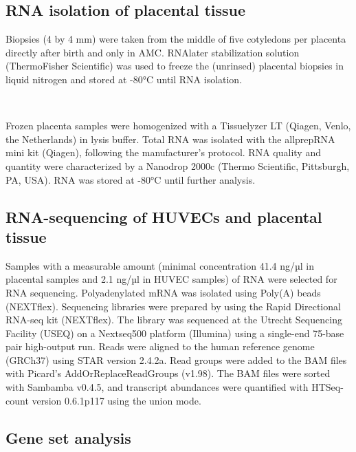 \documentclass[authordate, empirical]{jote-new-article}
\begin{document}
	\subsection{RNA isolation of placental tissue}



	Biopsies (4 by 4 mm) were taken from the middle of five cotyledons per placenta directly after birth and only in AMC. RNAlater stabilization solution (ThermoFisher Scientific) was used to freeze the (unrinsed) placental biopsies in liquid nitrogen and stored at -80°C until RNA isolation.



	 



	Frozen placenta samples were homogenized with a Tissuelyzer LT (Qiagen, Venlo, the Netherlands) in lysis buffer. Total RNA was isolated with the allprepRNA mini kit (Qiagen), following the manufacturer's protocol. RNA quality and quantity were characterized by a Nanodrop 2000c (Thermo Scientific, Pittsburgh, PA, USA). RNA was stored at -80°C until further analysis.







	\subsection{RNA-sequencing of HUVECs and placental tissue}



	Samples with a measurable amount (minimal concentration 41.4 ng/µl in placental samples and 2.1 ng/µl in HUVEC samples) of RNA were selected for RNA sequencing. Polyadenylated mRNA was isolated using Poly(A) beads (NEXTflex). Sequencing libraries were prepared by using the Rapid Directional RNA-seq kit (NEXTflex). The library was sequenced at the Utrecht Sequencing Facility (USEQ) on a Nextseq500 platform (Illumina) using a single-end 75-base pair high-output run. Reads were aligned to the human reference genome (GRCh37) using STAR version 2.4.2a. Read groups were added to the BAM files with Picard's AddOrReplaceReadGroups (v1.98). The BAM files were sorted with Sambamba v0.4.5, and transcript abundances were quantified with HTSeq-count version 0.6.1p117 using the union mode.







	\subsection{Gene set analysis }
\end{document}
